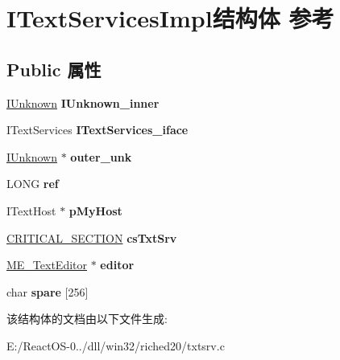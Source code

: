 \hypertarget{struct_i_text_services_impl}{}\section{I\+Text\+Services\+Impl结构体 参考}
\label{struct_i_text_services_impl}
\subsection*{Public 属性}
\begin{DoxyCompactItemize}
\item 
\mbox{\label{struct_i_text_services_impl_a1a2d673a888bcbe3dc135fcc3ecfd9cc}} 
\hyperlink{interface_i_unknown}{I\+Unknown} {\bfseries I\+Unknown\+\_\+inner}
\item 
\mbox{\label{struct_i_text_services_impl_a721505fa2d90e6617aa8118817e2c0a4}} 
I\+Text\+Services {\bfseries I\+Text\+Services\+\_\+iface}
\item 
\mbox{\label{struct_i_text_services_impl_a4088377a8e6e59b42728c8054292d406}} 
\hyperlink{interface_i_unknown}{I\+Unknown} $\ast$ {\bfseries outer\+\_\+unk}
\item 
\mbox{\label{struct_i_text_services_impl_ad0fab903ddda0940fb1f52410968677a}} 
L\+O\+NG {\bfseries ref}
\item 
\mbox{\label{struct_i_text_services_impl_ae10ac338571e8b16b90aa343401dcfde}} 
I\+Text\+Host $\ast$ {\bfseries p\+My\+Host}
\item 
\mbox{\label{struct_i_text_services_impl_a7bfbe0138d6f255dd81dfd89e702b69c}} 
\hyperlink{struct___c_r_i_t_i_c_a_l___s_e_c_t_i_o_n}{C\+R\+I\+T\+I\+C\+A\+L\+\_\+\+S\+E\+C\+T\+I\+ON} {\bfseries cs\+Txt\+Srv}
\item 
\mbox{\label{struct_i_text_services_impl_a05f77e4e3312019ceb118ea1d643767b}} 
\hyperlink{structtag_m_e___text_editor}{M\+E\+\_\+\+Text\+Editor} $\ast$ {\bfseries editor}
\item 
\mbox{\label{struct_i_text_services_impl_afa61d42e1d2cc3b8cf8571ed8afbbd51}} 
char {\bfseries spare} \mbox{[}256\mbox{]}
\end{DoxyCompactItemize}


该结构体的文档由以下文件生成\+:\begin{DoxyCompactItemize}
\item 
E\+:/\+React\+O\+S-\/0../dll/win32/riched20/txtsrv.\+c\end{DoxyCompactItemize}
